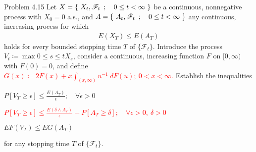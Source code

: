 	\begin{itembox}[l]{Problem 4.15}
		Let $X = \left\{\ X_t,\mathscr{F}_t\ \, ; \quad 0 \leq t < \infty\ \right\}$ be a continuous, nonnegative process
		with $X_0 = 0$ a.s., and $A = \left\{\ A_t,\mathscr{F}_t\ \, ; \quad 0 \leq t < \infty\ \right\}$ any continuous,
		increasing process for which
		\begin{align}
			E(X_T) \leq E(A_T)
		\end{align}
		holds for every bounded stopping time $T$ of $\{\mathscr{F}_t\}$. Introduce the process
		$V_t \coloneqq \max{0 \leq s \leq t}{X_s}$, consider a continuous, increasing function $F$
		on $[0,\infty)$ with $F(0) = 0$, and define \textcolor{red}{$G(x) \coloneqq 2F(x) + x\int_{(x,\infty)} u^{-1}\ dF(u);
		\ 0 < x < \infty$.} Establish the inequalities
		\begin{description}
			\item[(4.14)] $\displaystyle P[V_T \geq \epsilon] \leq \frac{E(A_T)}{\epsilon};\quad \forall \epsilon > 0$
			\textcolor{red}{\item[(4.15) (Lenglart inequality)] $\displaystyle P[V_T \geq \epsilon] 
				\leq \frac{E(\delta \wedge A_T)}{\epsilon} + P[A_T \geq \delta];\quad \forall \epsilon > 0,\ \delta > 0$}
			\item[(4.16)] $EF(V_T) \leq EG(A_T)$
		\end{description}
		for any stopping time $T$ of $\{\mathscr{F}_t\}$.
	\end{itembox}
	
